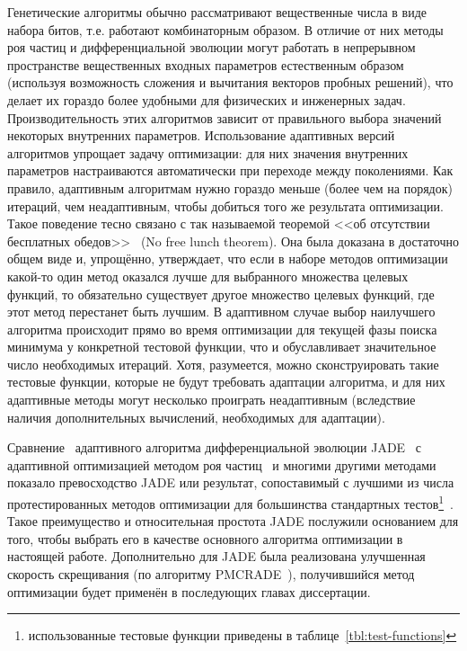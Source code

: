 Генетические алгоритмы обычно рассматривают вещественные числа в виде
набора битов, т.е. работают комбинаторным образом.  В отличие от них
методы роя частиц и дифференциальной эволюции могут работать в
непрерывном пространстве вещественных входных параметров естественным
образом (используя возможность сложения и вычитания векторов пробных
решений), что делает их гораздо более удобными для физических и
инженерных задач.  Производительность этих алгоритмов зависит от
правильного выбора значений некоторых внутренних параметров.
Использование адаптивных версий алгоритмов упрощает задачу
оптимизации: для них значения внутренних параметров настраиваются
автоматически при переходе между поколениями. Как правило, адаптивным
алгоритмам нужно гораздо меньше (более чем на порядок) итераций, чем
неадаптивным, чтобы добиться того же результата оптимизации. Такое
поведение тесно связано с так называемой теоремой <<об отсутствии
бесплатных обедов>>~\cite{Wolpert-NFL-1997} (No free lunch
theorem). Она была доказана в достаточно общем виде и, упрощённо,
утверждает, что если в наборе методов оптимизации какой-то один метод
оказался лучше для выбранного множества целевых функций, то
обязательно существует другое множество целевых функций, где этот
метод перестанет быть лучшим. В адаптивном случае выбор наилучшего
алгоритма происходит прямо во время оптимизации для текущей фазы
поиска минимума у конкретной тестовой функции, что и обуславливает
значительное число необходимых итераций. Хотя, разумеется, можно
сконструировать такие тестовые функции, которые не будут требовать
адаптации алгоритма, и для них адаптивные методы могут несколько
проиграть неадаптивным (вследствие наличия дополнительных вычислений,
необходимых для адаптации).

Сравнение~\cite{Gong-compare-EA-2014,Kang-compare-EA-RABC-2011}
адаптивного алгоритма дифференциальной эволюции
JADE~\cite{Jingqiao-JADE-2009} с адаптивной оптимизацией методом роя
частиц~\cite{Zhan-APSO-2008} и многими другими методами показало
превосходство JADE или результат, сопоставимый с лучшими из числа
протестированных методов оптимизации для большинства стандартных
тестов\footnote{использованные тестовые функции приведены в
  таблице~\ref{tbl:test-functions}}~\cite{Schwefel-1981,Rosenbrock-1960,Muhlenbein-1991,back-1996,Griewank-1981}.
Такое преимущество и относительная простота JADE послужили основанием
для того, чтобы выбрать его в качестве основного алгоритма оптимизации
в настоящей работе. Дополнительно для JADE была реализована улучшенная
скорость скрещивания (по алгоритму PMCRADE~\cite{Li-PMCRADE-2011}),
получившийся метод оптимизации будет применён в последующих главах
диссертации.



